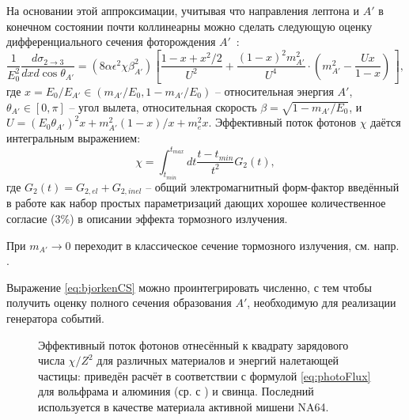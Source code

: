 На основании этой аппроксимации, учитывая что направления
лептона и $A'$ в конечном состоянии почти коллинеарны
можно сделать следующую оценку дифференциального сечения
фоторождения $A'$~\cite{bjorken, andreas2012, voronchihin2025}:
\begin{equation}
    \frac{1}{E^2_0} \frac{ d \sigma_{2 \rightarrow 3}}{d x d \cos{\theta_{A'}}} =
(8 \alpha \epsilon^2 \chi \beta_{A'}^2) \left[
    \frac{ 1 - x + x^2/2 }{U^2} + 
    \frac{ (1-x)^2 m^2_{A'} }{U^4} \cdot
        ( m^2_{A'} - \frac{U x}{1 - x} )
        \frac{}{}
\right],
    \label{eq:bjorkenCS}
\end{equation}
где $x = E_0/E_{A'} \in (m_{A'}/E_0, 1 - m_{A'}/E_0)$ -- относительная энергия
$A'$, $\theta_{A'} \in [0, \pi]$ -- угол вылета, относительная скорость
$\beta = \sqrt{ 1 - m_{A'}/E_0 }$, и
$U = (E_0 \theta_{A'} )^2 x + m^2_{A'} (1-x)/x + m_e^2 x$.
Эффективный поток фотонов $\chi$ даётся интегральным выражением:
\begin{equation}
\chi = \int_{t_{min}}^{t_{max}} d t \frac{t - t_{min}}{t^2} G_2 (t),
\label{eq:photoFlux}
\end{equation}
где $G_2(t) = G_{2, el} + G_{2, inel}$ -- общий электромагнитный форм-фактор
введённый в работе \cite{KimTsaiWWReview} как набор простых параметризаций
дающих хорошее количественное согласие (3\%) в описании эффекта тормозного
излучения.

При $m_{A'} \rightarrow 0$ переходит в классическое сечение тормозного
излучения, см. напр. \cite{bremsref}.

Выражение \eqref{eq:bjorkenCS} можно
проинтегрировать численно, с тем чтобы получить оценку полного
сечения образования $A'$, необходимую для реализации генератора событий.

\begin{figure}
    \centering
    
    \caption{ Эффективный поток фотонов отнесённый к квадрату зарядового числа
$\chi/Z^2$ для различных материалов и энергий налетающей частицы: приведён
расчёт в соответствии с формулой \eqref{eq:photoFlux} для вольфрама и алюминия
(ср. с \cite{bjorken}) и свинца. Последний используется в качестве материала
активной мишени NA64. }
\end{figure}

